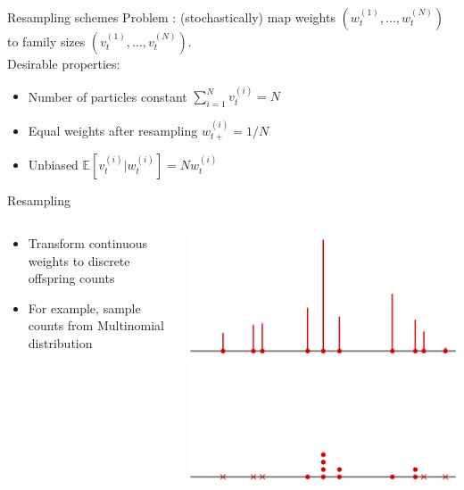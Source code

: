 \documentclass[aspectratio=169]{beamer}
\theoremstyle{definition}
\newcommand{\E}{\mathbb{E}}
\newcommand{\vt}[2][t]{v_{#1}^{(#2)}}
\newcommand{\wt}[2][t]{w_{#1}^{(#2)}}
\begin{document}
\begin{frame}{Resampling schemes}
Problem : (stochastically) map weights $(\wt{1}, \dots, \wt{N})$ to family sizes $(\vt{1},\dots, \vt{N})$.\\

\pause
Desirable properties:
\begin{itemize}
\item Number of particles constant $\sum_{i=1}^N \vt{i} =N$
\item Equal weights after resampling $w_{t+}^{(i)} = 1/N$
\item Unbiased $\E[\vt{i} | \wt{i}] = N\wt{i}$
\end{itemize}
\end{frame}

\begin{frame}{Resampling} %
\begin{columns}
\begin{column}{0.45\textwidth}
\begin{itemize}
\item Transform continuous weights to discrete offspring counts
\item For example, sample counts from Multinomial distribution 
\end{itemize}
\end{column}
\begin{column}{0.45\textwidth}
\centering
\includegraphics[width=\textwidth]{resample1.pdf} \\
\includegraphics[width=\textwidth]{resample2.pdf}
\end{column}
\end{columns}
\end{frame}
\end{document}
